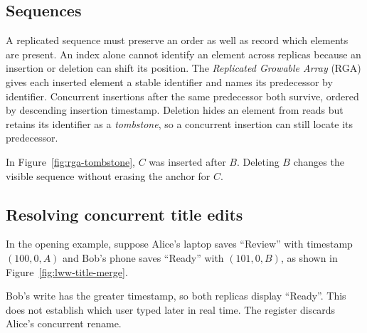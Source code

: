\subsection{Sequences}

A replicated sequence must preserve an order as well as record which elements are present.
An index alone cannot identify an element across replicas because an insertion or deletion can shift its position.
The \emph{Replicated Growable Array} (RGA) gives each inserted element a stable identifier and names its predecessor by identifier.
Concurrent insertions after the same predecessor both survive, ordered by descending insertion timestamp.
Deletion hides an element from reads but retains its identifier as a \emph{tombstone}, so a concurrent insertion can still locate its predecessor.
\parencite[Section~3.5.1]{comprehensive-study-crdts}

In Figure~\ref{fig:rga-tombstone}, \(C\) was inserted after \(B\).
Deleting \(B\) changes the visible sequence without erasing the anchor for \(C\).
\begin{illustration}[htbp]
	\centering
	\caption{An RGA retains a deleted element as an insertion anchor}
	\label{fig:rga-tombstone}
	
\end{illustration}
\FloatBarrier

\newpage
\subsection{Resolving concurrent title edits}

In the opening example, suppose Alice's laptop saves \enquote{Review} with timestamp \((100,0,A)\) and Bob's phone saves \enquote{Ready} with \((101,0,B)\), as shown in Figure~\ref{fig:lww-title-merge}.

\begin{illustration}[htbp]
	\centering
	\caption{Concurrent title updates in a state-based LWW register}
	\label{fig:lww-title-merge}
	
\end{illustration}
\FloatBarrier

Bob's write has the greater timestamp, so both replicas display \enquote{Ready}.
This does not establish which user typed later in real time.
The register discards Alice's concurrent rename.
